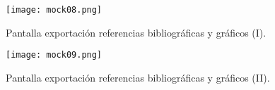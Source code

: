 \begin{figure}[!hp]
	\begin{center} 
		\texttt{[image: mock08.png]}
		\caption{Pantalla exportación referencias bibliográficas y gráficos (I).}
		\label{fig:mock08}
	\end{center}
\end{figure}

\begin{figure}[!hp]
	\begin{center} 
		\texttt{[image: mock09.png]}
		\caption{Pantalla exportación referencias bibliográficas y gráficos (II).}
		\label{fig:mock09}
	\end{center}
\end{figure}

